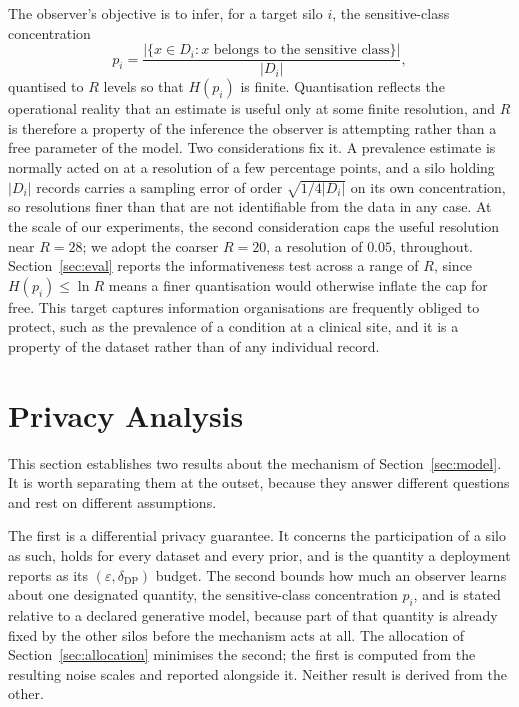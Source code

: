 \documentclass[acmsmall,screen,review,anonymous]{acmart}
\theoremstyle{acmdefinition}%
\begin{document}
The observer's objective is to infer, for a target silo $i$, the sensitive-class
concentration
\begin{equation}
p_i = \frac{\big|\{x \in D_i : x \text{ belongs to the sensitive class}\}\big|}{|D_i|},
\end{equation}
quantised to $R$ levels so that $H(p_i)$ is finite. Quantisation reflects the
operational reality that an estimate is useful only at some finite resolution, and
$R$ is therefore a property of the inference the observer is attempting rather than
a free parameter of the model. Two considerations fix it. A prevalence estimate is
normally acted on at a resolution of a few percentage points, and a silo holding
$|D_i|$ records carries a sampling error of order $\sqrt{1/4|D_i|}$ on its own
concentration, so resolutions finer than that are not identifiable from the data in
any case. At the scale of our experiments, the second consideration caps the
useful resolution near $R = 28$; we adopt the coarser $R = 20$, a resolution of
$0.05$, throughout. Section~\ref{sec:eval} reports the informativeness test across
a range of $R$, since $H(p_i) \le \ln R$ means a finer quantisation would otherwise
inflate the cap for free. This target captures information organisations are
frequently obliged to protect, such as the prevalence of a condition at a clinical
site, and it is a property of the dataset rather than of any individual record.

\section{Privacy Analysis}
\label{sec:theory}

This section establishes two results about the mechanism of Section~\ref{sec:model}.
It is worth separating them at the outset, because they answer different
questions and rest on different assumptions.

The first is a differential privacy guarantee. It concerns the participation of a
silo as such, holds for every dataset and every prior, and is the quantity a
deployment reports as its $(\varepsilon, \delta_{\mathrm{DP}})$ budget. The second
bounds how much an observer learns about one designated quantity, the
sensitive-class concentration $p_i$, and is stated relative to a declared
generative model, because part of that quantity is already fixed by the other
silos before the mechanism acts at all. The allocation of
Section~\ref{sec:allocation} minimises the second; the first is computed from the
resulting noise scales and reported alongside it. Neither result is derived from
the other.
\end{document}
